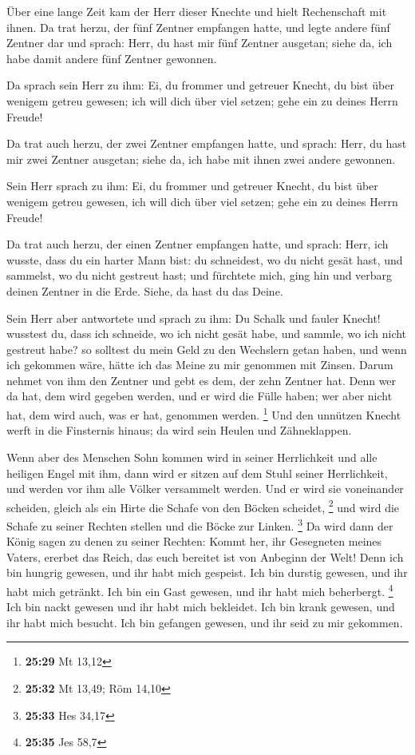  Über eine lange Zeit kam der Herr dieser Knechte und
hielt Rechenschaft mit ihnen.  Da trat herzu, der fünf
Zentner empfangen hatte, und legte andere fünf Zentner dar und sprach:
Herr, du hast mir fünf Zentner ausgetan; siehe da, ich habe damit andere
fünf Zentner gewonnen.

 Da sprach sein Herr zu ihm: Ei, du frommer und getreuer
Knecht, du bist über wenigem getreu gewesen; ich will dich über viel
setzen; gehe ein zu deines Herrn Freude!

 Da trat auch herzu, der zwei Zentner empfangen hatte,
und sprach: Herr, du hast mir zwei Zentner ausgetan; siehe da, ich habe
mit ihnen zwei andere gewonnen.

 Sein Herr sprach zu ihm: Ei, du frommer und getreuer
Knecht, du bist über wenigem getreu gewesen, ich will dich über viel
setzen; gehe ein zu deines Herrn Freude!

 Da trat auch herzu, der einen Zentner empfangen hatte,
und sprach: Herr, ich wusste, dass du ein harter Mann bist: du
schneidest, wo du nicht gesät hast, und sammelst, wo du nicht gestreut
hast;  und fürchtete mich, ging hin und verbarg deinen
Zentner in die Erde. Siehe, da hast du das Deine.

 Sein Herr aber antwortete und sprach zu ihm: Du Schalk
und fauler Knecht! wusstest du, dass ich schneide, wo ich nicht gesät
habe, und sammle, wo ich nicht gestreut habe?  so
solltest du mein Geld zu den Wechslern getan haben, und wenn ich
gekommen wäre, hätte ich das Meine zu mir genommen mit Zinsen.
 Darum nehmet von ihm den Zentner und gebt es dem, der
zehn Zentner hat.  Denn wer da hat, dem wird gegeben
werden, und er wird die Fülle haben; wer aber nicht hat, dem wird auch,
was er hat, genommen werden. \footnote{\textbf{25:29} Mt 13,12}
 Und den unnützen Knecht werft in die Finsternis hinaus;
da wird sein Heulen und Zähneklappen.

 Wenn aber des Menschen Sohn kommen wird in seiner
Herrlichkeit und alle heiligen Engel mit ihm, dann wird er sitzen auf
dem Stuhl seiner Herrlichkeit,  und werden vor ihm alle
Völker versammelt werden. Und er wird sie voneinander scheiden, gleich
als ein Hirte die Schafe von den Böcken scheidet, \footnote{\textbf{25:32}
  Mt 13,49; Röm 14,10}  und wird die Schafe zu seiner
Rechten stellen und die Böcke zur Linken. \footnote{\textbf{25:33} Hes
  34,17}  Da wird dann der König sagen zu denen zu seiner
Rechten: Kommt her, ihr Gesegneten meines Vaters, ererbet das Reich, das
euch bereitet ist von Anbeginn der Welt!  Denn ich bin
hungrig gewesen, und ihr habt mich gespeist. Ich bin durstig gewesen,
und ihr habt mich getränkt. Ich bin ein Gast gewesen, und ihr habt mich
beherbergt. \footnote{\textbf{25:35} Jes 58,7}  Ich bin
nackt gewesen und ihr habt mich bekleidet. Ich bin krank gewesen, und
ihr habt mich besucht. Ich bin gefangen gewesen, und ihr seid zu mir
gekommen.


